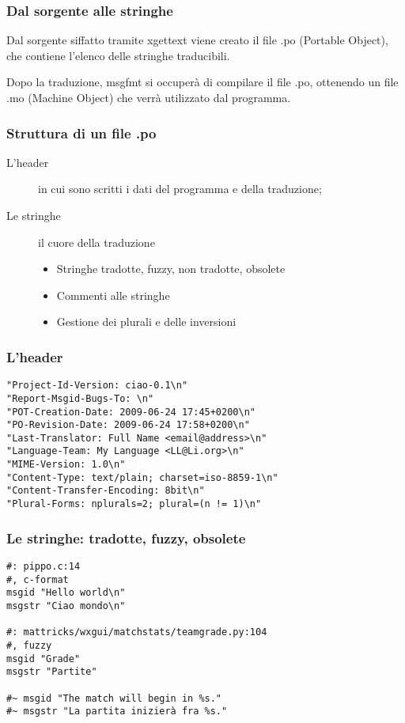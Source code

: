 \documentclass{beamer}
\begin{document}
\begin{frame}\frametitle{Dal sorgente alle stringhe}

Dal sorgente siffatto tramite xgettext viene creato il file .po
(Portable Object), che contiene l'elenco delle stringhe traducibili.

Dopo la traduzione, msgfmt si occuperà di compilare il file .po,
ottenendo un file .mo (Machine Object) che verrà utilizzato dal
programma.
\end{frame}

\begin{frame}\frametitle{Struttura di un file .po}
\begin{description}
\item [L'header] in cui sono scritti i dati del programma e della
traduzione;
\item [Le stringhe] il cuore della traduzione
\begin{itemize}
\item Stringhe tradotte, fuzzy, non tradotte, obsolete
\item Commenti alle stringhe
\item Gestione dei plurali e delle inversioni
\end{itemize}
\end{description}
\end{frame}

\begin{frame}
\frametitle{L'header}
\begin{verbatim}
"Project-Id-Version: ciao-0.1\n"
"Report-Msgid-Bugs-To: \n"
"POT-Creation-Date: 2009-06-24 17:45+0200\n"
"PO-Revision-Date: 2009-06-24 17:58+0200\n"
"Last-Translator: Full Name <email@address>\n"
"Language-Team: My Language <LL@Li.org>\n"
"MIME-Version: 1.0\n"
"Content-Type: text/plain; charset=iso-8859-1\n"
"Content-Transfer-Encoding: 8bit\n"
"Plural-Forms: nplurals=2; plural=(n != 1)\n"
\end{verbatim}
\end{frame}

\begin{frame}
\frametitle{Le stringhe: tradotte, fuzzy, obsolete}
\begin{verbatim}
#: pippo.c:14
#, c-format
msgid "Hello world\n"
msgstr "Ciao mondo\n"

#: mattricks/wxgui/matchstats/teamgrade.py:104
#, fuzzy
msgid "Grade"
msgstr "Partite"

#~ msgid "The match will begin in %s."
#~ msgstr "La partita inizierà fra %s."
\end{verbatim}
\end{frame}
\end{document}
